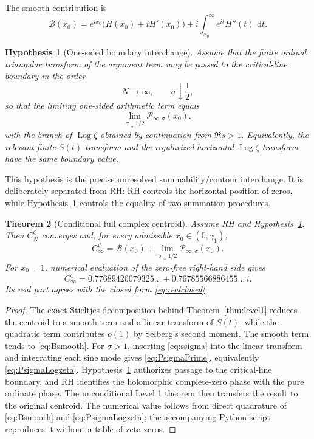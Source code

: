 \documentclass[11pt]{amsart}
\numberwithin{equation}{section}
\newtheorem{theorem}{Theorem}[section]
\newtheorem{hypothesis}[theorem]{Hypothesis}
\theoremstyle{definition}
\theoremstyle{remark}
\newcommand{\dd}{\,\mathrm d}
\newcommand{\Log}{\operatorname{Log}}
\newcommand{\cP}{\mathcal P}
\newcommand{\cB}{\mathcal B}
\begin{document}
The smooth contribution is
\begin{equation}\label{eq:Bsmooth}
\cB(x_0)
=e^{ix_0}\bigl(H(x_0)+iH'(x_0)\bigr)
+i\int_{x_0}^{\infty}e^{it}H''(t)\,\dd t.
\end{equation}

\begin{hypothesis}[One-sided boundary interchange]\label{hyp:BI}
Assume that the finite ordinal triangular transform of the argument term may be passed to the critical-line boundary in the order
\[
N\to\infty,
\qquad \sigma\downarrow\frac12,
\]
so that the limiting one-sided arithmetic term equals
\[
\lim_{\sigma\downarrow1/2}\cP_{\infty,\sigma}(x_0),
\]
with the branch of $\Log\zeta$ obtained by continuation from $\Re s>1$. Equivalently, the relevant finite $S(t)$ transform and the regularized horizontal-$\Log\zeta$ transform have the same boundary value.
\end{hypothesis}

This hypothesis is the precise unresolved summability/contour interchange. It is deliberately separated from RH: RH controls the horizontal position of zeros, while Hypothesis~\ref{hyp:BI} controls the equality of two summation procedures.

\begin{theorem}[Conditional full complex centroid]\label{thm:fullconstant}
Assume RH and Hypothesis~\ref{hyp:BI}. Then $C_N^{\zeta}$ converges and, for every admissible $x_0\in(0,\gamma_1)$,
\begin{equation}\label{eq:Cfullformula}
\boxed{
C_\infty^{\zeta}
=\cB(x_0)+\lim_{\sigma\downarrow1/2}\cP_{\infty,\sigma}(x_0).
}
\end{equation}
For $x_0=1$, numerical evaluation of the zero-free right-hand side gives
\begin{equation}\label{eq:CstarNumeric}
\boxed{
C_\infty^{\zeta}=
0.77689426079325\ldots
+0.76785566886455\ldots\,i.
}
\end{equation}
Its real part agrees with the closed form \eqref{eq:realclosed}.
\end{theorem}
\begin{proof}
The exact Stieltjes decomposition behind Theorem~\ref{thm:level1} reduces the centroid to a smooth term and a linear transform of $S(t)$, while the quadratic term contributes $o(1)$ by Selberg's second moment. The smooth term tends to \eqref{eq:Bsmooth}. For $\sigma>1$, inserting \eqref{eq:ssigma} into the linear transform and integrating each sine mode gives \eqref{eq:PsigmaPrime}, equivalently \eqref{eq:PsigmaLogzeta}. Hypothesis~\ref{hyp:BI} authorizes passage to the critical-line boundary, and RH identifies the holomorphic complete-zero phase with the pure ordinate phase. The unconditional Level 1 theorem then transfers the result to the original centroid. The numerical value follows from direct quadrature of \eqref{eq:Bsmooth} and \eqref{eq:PsigmaLogzeta}; the accompanying Python script reproduces it without a table of zeta zeros.
\end{proof}
\end{document}
